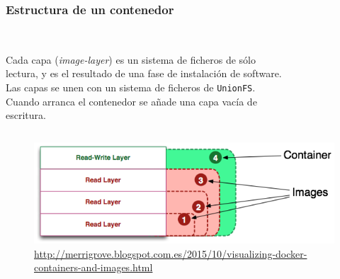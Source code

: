 \documentclass[xcolor=dvipsnames]{beamer}
\begin{document}
\begin{frame}[fragile]
	\frametitle{Estructura de un contenedor}

		\begin{columns}[c]
			\begin{column}[t]{6cm}
			~\\
Cada capa (\textit{image-layer}) es un sistema de ficheros de sólo lectura, y es el resultado de una fase de instalación de software. Las capas se unen con un sistema de ficheros de \texttt{UnionFS}. Cuando arranca el contenedor se añade una capa vacía de escritura.
			\end{column}
			\begin{column}[t]{4cm}
				\begin{figure}
					\begin{center}
\begin{figure}
\includegraphics[width=\linewidth]{./what_is_layered_filesystems_sm}
\label{fig:what_is_layered_filesystems_sm}
\end{figure}
					\end{center}
				\end{figure}
			\end{column}
		\end{columns}
\begin{figure}
\includegraphics[width=0.7\linewidth]{capas}
\label{fig:capas}
{\tiny \url{http://merrigrove.blogspot.com.es/2015/10/visualizing-docker-containers-and-images.html} }
\end{figure}
\end{frame}
\end{document}
